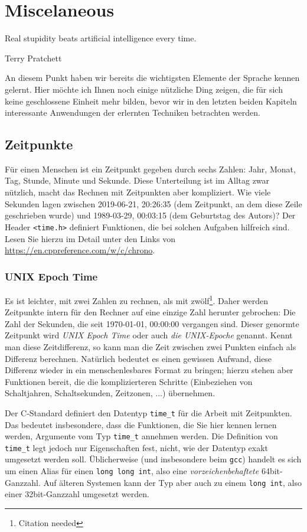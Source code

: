 \chapter{Miscelaneous} \label{chp:misc}
\epigraph{Real stupidity beats artificial intelligence every time.}{Terry Pratchett}

An diesem Punkt haben wir bereits die wichtigsten Elemente der Sprache kennen gelernt. Hier möchte ich Ihnen noch einige nützliche Ding zeigen, die für sich keine geschlossene Einheit mehr bilden, bevor wir in den letzten beiden Kapiteln interessante Anwendungen der erlernten Techniken betrachten werden.

\section{Zeitpunkte}
Für einen Menschen ist ein Zeitpunkt gegeben durch sechs Zahlen: Jahr, Monat, Tag, Stunde, Minute und Sekunde. Diese Unterteilung ist im Alltag zwar nützlich, macht das Rechnen mit Zeitpunkten aber kompliziert. Wie viele Sekunden lagen zwischen 2019-06-21, 20:26:35 (dem Zeitpunkt, an dem diese Zeile geschrieben wurde) und 1989-03-29, 00:03:15 (dem Geburtstag des Autors)? Der Header \texttt{<time.h>} definiert Funktionen, die bei solchen Aufgaben hilfreich sind. Lesen Sie hierzu im Detail unter den Links von \url{https://en.cppreference.com/w/c/chrono}.

\subsection{UNIX Epoch Time}
Es ist leichter, mit zwei Zahlen zu rechnen, als mit zwölf\footnote{Citation needed}. Daher werden Zeitpunkte intern für den Rechner auf eine einzige Zahl herunter gebrochen: Die Zahl der Sekunden, die seit 1970-01-01, 00:00:00 vergangen sind. Dieser genormte Zeitpunkt wird \emph{UNIX Epoch Time} oder auch \emph{die UNIX-Epoche} genannt. Kennt man diese Zeitdifferenz, so kann man die Zeit zwischen zwei Punkten einfach als Differenz berechnen. Natürlich bedeutet es einen gewissen Aufwand, diese Differenz wieder in ein menschenlesbares Format zu bringen; hierzu stehen aber Funktionen bereit, die die komplizierteren Schritte (Einbeziehen von Schaltjahren, Schaltsekunden, Zeitzonen, ...) übernehmen.

Der C-Standard definiert den Datentyp \texttt{time_t} für die Arbeit mit Zeitpunkten. Das bedeutet insbesondere, dass die Funktionen, die Sie hier kennen lernen werden, Argumente vom Typ 
\texttt{time_t} annehmen werden. Die Definition von \texttt{time_t} legt jedoch nur Eigenschaften fest, nicht, wie der Datentyp exakt umgesetzt werden soll. Üblicherweise (und insbesondere beim \texttt{gcc}) handelt es sich um einen Alias für einen \texttt{long long int}, also eine \emph{vorzeichenbehaftete} 64bit-Ganzzahl. Auf älteren Systemen kann der Typ aber auch zu einem \texttt{long int}, also einer 32bit-Ganzzahl umgesetzt werden. 


